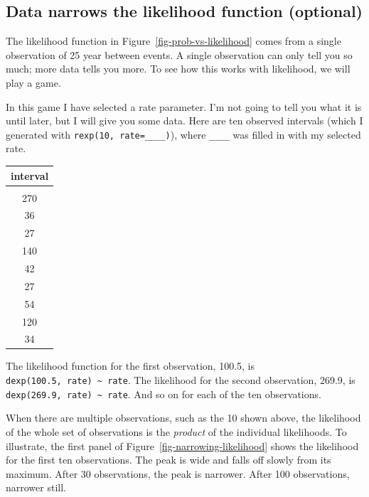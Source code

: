 \documentclass[
  letterpaper,
  DIV=11,
  numbers=noendperiod,
  oneside]{scrartcl}
\begin{document}
\subsection{Data narrows the likelihood function
(optional)}\label{data-narrows-the-likelihood-function-optional}

The likelihood function in Figure~\ref{fig-prob-vs-likelihood} comes
from a single observation of 25 year between events. A single
observation can only tell you so much; more data tells you more. To see
how this works with likelihood, we will play a game.

In this game I have selected a rate parameter. I'm not going to tell you
what it is until later, but I will give you some data. Here are ten
observed intervals (which I generated with
\texttt{rexp(10,\ rate=\_\_\_\_)}), where \texttt{\_\_\_\_} was filled
in with my selected rate.

\begin{longtable}[]{@{}c@{}}
\toprule\noalign{}
interval \\
\midrule\noalign{}
\endhead
\bottomrule\noalign{}
\endlastfoot
100 \\
270 \\
36 \\
27 \\
140 \\
42 \\
27 \\
54 \\
120 \\
34 \\
\end{longtable}

The likelihood function for the first observation, 100.5, is
\texttt{dexp(100.5,\ rate)\ \textasciitilde{}\ rate}. The likelihood for
the second observation, 269.9, is
\texttt{dexp(269.9,\ rate)\ \textasciitilde{}\ rate}. And so on for each
of the ten observations.

When there are multiple observations, such as the 10 shown above, the
likelihood of the whole set of observations is the \emph{product} of the
individual likelihoods. To illustrate, the first panel of
Figure~\ref{fig-narrowing-likelihood} shows the likelihood for the first
ten observations. The peak is wide and falls off slowly from its
maximum. After 30 observations, the peak is narrower. After 100
observations, narrower still.
\end{document}
